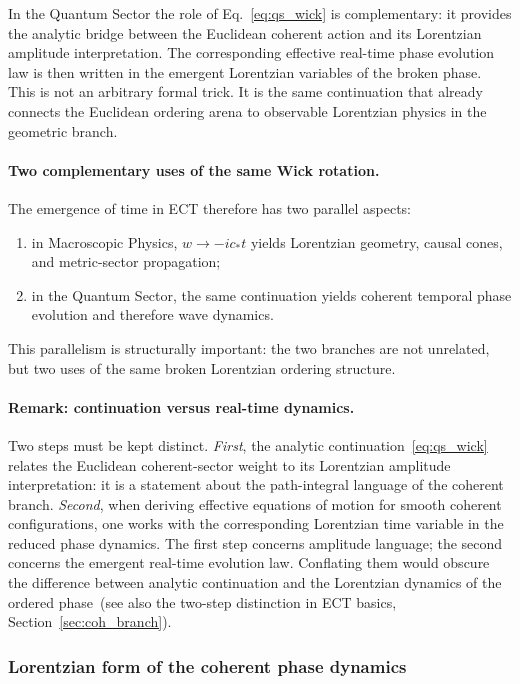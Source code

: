 In the Quantum Sector the role of Eq.~\eqref{eq:qs_wick} is
complementary: it provides the analytic bridge between the Euclidean
coherent action and its Lorentzian amplitude interpretation.
The corresponding effective real-time phase evolution law is then
written in the emergent Lorentzian variables of the broken phase.
This is not an arbitrary formal trick.
It is the same continuation that already connects the Euclidean
ordering arena to observable Lorentzian physics in the geometric branch.

\paragraph{Two complementary uses of the same Wick rotation.}
The emergence of time in ECT therefore has two parallel aspects:
\begin{enumerate}[label=(\roman*)]
  \item in Macroscopic Physics, $w\to -ic_*t$ yields Lorentzian
    geometry, causal cones, and metric-sector propagation;
  \item in the Quantum Sector, the same continuation yields coherent
    temporal phase evolution and therefore wave dynamics.
\end{enumerate}
This parallelism is structurally important: the two branches are not
unrelated, but two uses of the same broken Lorentzian ordering
structure.


\paragraph{Remark: continuation versus real-time dynamics.}
Two steps must be kept distinct.
\textit{First}, the analytic continuation~\eqref{eq:qs_wick}
relates the Euclidean coherent-sector weight to its Lorentzian
amplitude interpretation: it is a statement about the
path-integral language of the coherent branch.
\textit{Second}, when deriving effective equations of motion for
smooth coherent configurations, one works with the corresponding
Lorentzian time variable in the reduced phase dynamics.
The first step concerns amplitude language;
the second concerns the emergent real-time evolution law.
Conflating them would obscure the difference between analytic
continuation and the Lorentzian dynamics of the ordered phase~(see
also the two-step distinction in ECT basics,
Section~\ref{sec:coh_branch}).

\subsubsection*{Lorentzian form of the coherent phase dynamics}

